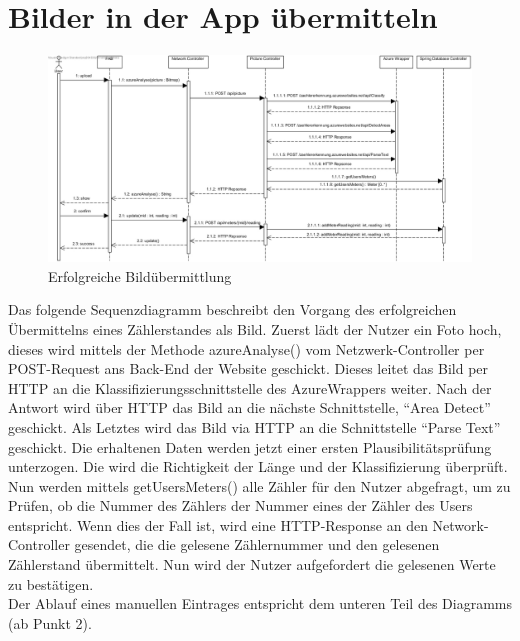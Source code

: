 \section{Bilder in der App übermitteln}
\begin{figure}[H]
	\centering
	\includegraphics[width=16cm]{img/diagrams/SubmitFotoSequence}
	\caption{Erfolgreiche Bildübermittlung}
\end{figure}
Das folgende Sequenzdiagramm beschreibt den Vorgang des erfolgreichen Übermittelns eines Zählerstandes als Bild.
Zuerst lädt der Nutzer ein Foto hoch, dieses wird mittels der Methode azureAnalyse() vom Netzwerk-Controller per POST-Request ans Back-End der Website geschickt. Dieses leitet das Bild per HTTP an die Klassifizierungsschnittstelle des AzureWrappers weiter. Nach der Antwort wird über HTTP das Bild an die nächste Schnittstelle, ``Area Detect'' geschickt. Als Letztes wird das Bild via HTTP an die Schnittstelle ``Parse Text''  geschickt. Die erhaltenen Daten werden jetzt einer ersten Plausibilitätsprüfung unterzogen. Die wird die Richtigkeit der Länge und der Klassifizierung überprüft.\\
Nun werden mittels getUsersMeters() alle Zähler für den Nutzer abgefragt, um zu Prüfen, ob die Nummer des Zählers der Nummer eines der Zähler des Users entspricht.
Wenn dies der Fall ist, wird eine HTTP-Response an den Network-Controller gesendet, die die gelesene Zählernummer und den gelesenen Zählerstand übermittelt. Nun wird der Nutzer aufgefordert die gelesenen Werte zu bestätigen. \\
Der Ablauf eines manuellen Eintrages entspricht dem unteren Teil des Diagramms (ab Punkt 2).

